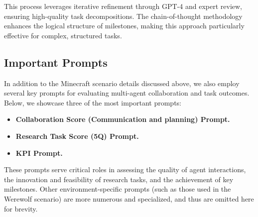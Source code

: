 This process leverages iterative refinement through GPT-4 and expert review, ensuring high-quality task decompositions. The chain-of-thought methodology enhances the logical structure of milestones, making this approach particularly effective for complex, structured tasks.




\subsection{Important Prompts}
\label{sec:important-prompts}

In addition to the Minecraft scenario details discussed above, we also employ several key prompts for evaluating multi-agent collaboration and task outcomes. Below, we showcase three of the most important prompts:

\begin{itemize}
    \item \textbf{Collaboration Score (Communication and planning) Prompt.} 
    \item \textbf{Research Task Score (5Q) Prompt.}
    \item \textbf{KPI Prompt.}
\end{itemize}

These prompts serve critical roles in assessing the quality of agent interactions, the innovation and feasibility of research tasks, and the achievement of key milestones. 
Other environment-specific prompts (such as those used in the Werewolf scenario) are more numerous and specialized, and thus are omitted here for brevity.


